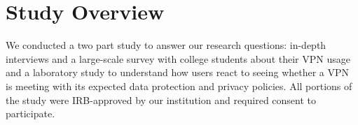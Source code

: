 \section{Study Overview}\label{sec:overview}

We conducted a two part study to answer our research questions:  in-depth interviews and  a large-scale survey with college students about their VPN usage and a laboratory study to understand how users react to seeing whether a VPN is meeting with its expected data protection and privacy policies. All portions of the study were IRB-approved by our institution and required consent to participate.

